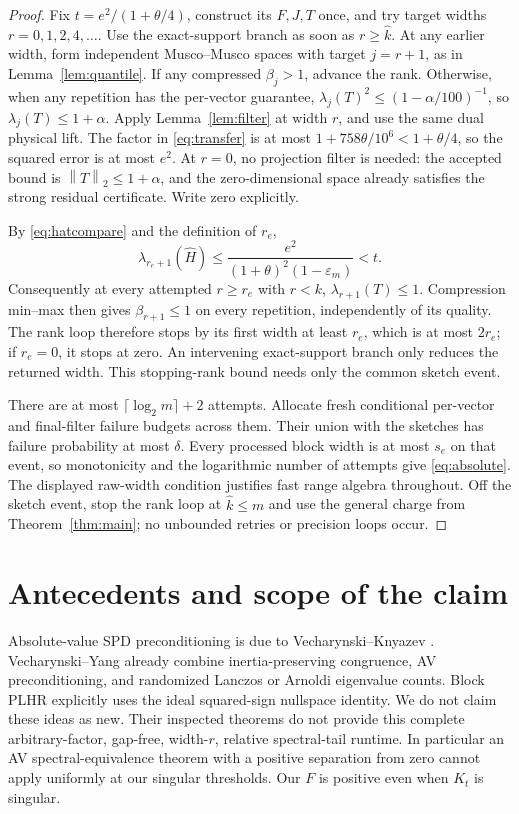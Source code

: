 \documentclass[11pt]{article}
\newcommand{\norm}[1]{\left\lVert#1\right\rVert}
\begin{document}
\begin{proof}
Fix \(t=e^2/(1+\theta/4)\), construct its \(F,J,T\) once, and
try target widths \(r=0,1,2,4,\ldots\). Use the exact-support branch
as soon as \(r\geq\widehat k\). At any earlier width, form independent
Musco--Musco spaces with target \(j=r+1\), as in
Lemma~\ref{lem:quantile}. If any compressed \(\beta_j>1\), advance
the rank. Otherwise, when any repetition has the per-vector guarantee,
\(\lambda_j(T)^2\leq(1-\alpha/100)^{-1}\), so
\(\lambda_j(T)\leq1+\alpha\). Apply Lemma~\ref{lem:filter} at
width \(r\), and use the same dual physical lift. The factor in
\eqref{eq:transfer} is at most \(1+758\theta/10^6<1+\theta/4\),
so the squared error is at most \(e^2\).
At \(r=0\), no projection filter is needed: the accepted bound is
\(\norm T_2\leq1+\alpha\), and the zero-dimensional space already
satisfies the strong residual certificate. Write zero explicitly.

By \eqref{eq:hatcompare} and the definition of \(r_e\),
\[
 \lambda_{r_e+1}(\widehat H)
 \leq\frac{e^2}{(1+\theta)^2(1-\varepsilon_m)}<t.
\]
Consequently at every attempted \(r\geq r_e\) with \(r<k\),
\(\lambda_{r+1}(T)\leq1\). Compression min--max then gives
\(\beta_{r+1}\leq1\) on every repetition, independently of its quality.
The rank loop therefore stops by its first width at least \(r_e\),
which is at most \(2r_e\); if \(r_e=0\), it stops at zero.
An intervening exact-support branch only reduces the returned width.
This stopping-rank bound needs only the common sketch event.

There are at most \(\lceil\log_2m\rceil+2\) attempts. Allocate fresh
conditional per-vector and final-filter failure budgets across them.
Their union with the sketches has failure probability at most \(\delta\).
Every processed block width is at most \(s_e\) on that event, so
monotonicity and the logarithmic number of attempts give
\eqref{eq:absolute}. The displayed raw-width condition justifies fast
range algebra throughout. Off the sketch event, stop the rank loop at
\(\widehat k\leq m\) and use the general charge from
Theorem~\ref{thm:main}; no unbounded retries or precision loops occur.
\end{proof}

\section{Antecedents and scope of the claim}
Absolute-value SPD preconditioning is due to Vecharynski--Knyazev
\cite{vk}. Vecharynski--Yang \cite{vy} already combine inertia-preserving
congruence, AV preconditioning, and randomized Lanczos or Arnoldi
eigenvalue counts. Block PLHR \cite{plhr} explicitly uses the ideal
squared-sign nullspace identity. We do not claim these ideas as new.
Their inspected theorems do not provide this complete arbitrary-factor,
gap-free, width-\(r\), relative spectral-tail runtime. In particular an
AV spectral-equivalence theorem with a positive separation from zero
cannot apply uniformly at our singular thresholds. Our \(F\) is positive
even when \(K_t\) is singular.
\end{document}
